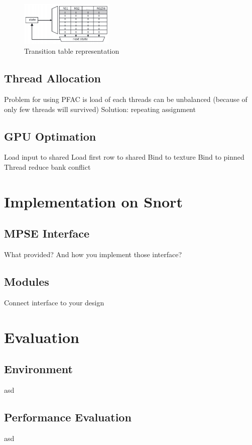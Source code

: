 \documentclass[conference]{IEEEtran}
\begin{document}
    \begin{figure}[htbp]
        \centerline{\includegraphics[width=0.4\textwidth]{../src/resources/table.png}}
        \caption{Transition table representation}
        \label{fig}
    \end{figure}

    \subsection{Thread Allocation}
        Problem for using PFAC is load of each threads can be unbalanced (because of only few threads will survived)
        Solution: repeating assignment

    \subsection{GPU Optimation}
        Load input to shared
        Load first row to shared
        Bind to texture
        Bind to pinned
        Thread reduce bank conflict

\section{Implementation on Snort}
    \subsection{MPSE Interface}
        What provided? And how you implement those interface?

    \subsection{Modules}
        Connect interface to your design

\section{Evaluation}
    \subsection{Environment}
        asd
        
    \subsection{Performance Evaluation}
        asd
\end{document}
